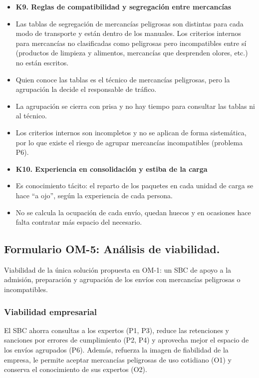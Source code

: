 \documentclass[12pt,a4paper,twoside,spanish]{article}      %
\begin{document}
{\begin{itemize}
    \item[] \textbf{K9. Reglas de compatibilidad y segregación entre mercancías}
    \item[(22)] Las tablas de segregación de mercancías peligrosas son distintas para cada modo de transporte y están dentro de los manuales. Los criterios internos para mercancías no clasificadas como peligrosas pero incompatibles entre sí (productos de limpieza y alimentos, mercancías que desprenden olores, etc.) no están escritos.
    \item[(23)] Quien conoce las tablas es el técnico de mercancías peligrosas, pero la agrupación la decide el responsable de tráfico.
    \item[(24)] La agrupación se cierra con prisa y no hay tiempo para consultar las tablas ni al técnico.
    \item[(25)] Los criterios internos son incompletos y no se aplican de forma sistemática, por lo que existe el riesgo de agrupar mercancías incompatibles (problema P6).

    \item[] \textbf{K10. Experiencia en consolidación y estiba de la carga}
    \item[(26)] Es conocimiento tácito: el reparto de los paquetes en cada unidad de carga se hace ``a ojo'', según la experiencia de cada persona.
    \item[(27)] No se calcula la ocupación de cada envío, quedan huecos y en ocasiones hace falta contratar más espacio del necesario.
\end{itemize}
}

\pagebreak
\subsection{Formulario OM-5: Análisis de viabilidad.}
\setlength{\parskip}{0.25cm}

Viabilidad de la única solución propuesta en OM-1: un SBC de apoyo a la admisión, preparación y agrupación de los envíos con mercancías peligrosas o incompatibles.

\subsubsection{Viabilidad empresarial}

El SBC ahorra consultas a los expertos (P1, P3), reduce las retenciones y sanciones por errores de cumplimiento (P2, P4) y aprovecha mejor el espacio de los envíos agrupados (P6). Además, refuerza la imagen de fiabilidad de la empresa, le permite aceptar mercancías peligrosas de uso cotidiano (O1) y conserva el conocimiento de sus expertos (O2).
\end{document}
